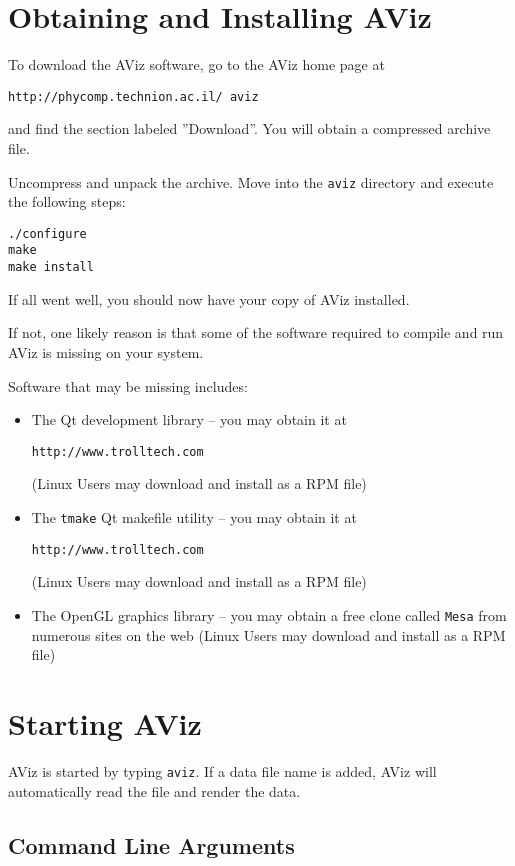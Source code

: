 \documentclass[11pt]{article}
\begin{document}
\section{Obtaining and Installing AViz}

To download the AViz software, go to the AViz home page at 
\begin{center}
{\tt http://phycomp.technion.ac.il/~aviz} 
\end{center}
and find the section labeled 
''Download''.  You will obtain a compressed archive file.  

Uncompress and unpack the archive.  Move into the {\tt aviz} directory 
and execute the following steps:

\begin{verbatim}
./configure
make
make install
\end{verbatim}

If all went well, you should now have your copy of AViz installed.  

If not, one likely reason is that some of the software required to compile
and run AViz is missing on your system.  

Software that may be missing includes:
\begin{itemize}
\item The Qt development library -- you may obtain it 
at 
\begin{center}
{\tt http://www.trolltech.com} 
\end{center}
(Linux Users may download and install as 
a RPM file)
\item The {\tt tmake} Qt makefile utility -- you may obtain it 
at 
\begin{center}
{\tt http://www.trolltech.com} 
\end{center}
(Linux Users may download and install 
as a RPM file)
\item The OpenGL graphics library -- you may obtain a free clone called 
{\tt Mesa} from numerous sites on the web (Linux Users may download and install as a RPM file)
\end{itemize}


\section{Starting AViz}

AViz is started by typing {\tt aviz}.  If a data file name is added, AViz 
will automatically read the file and render the data.

\subsection{Command Line Arguments}
\end{document}
